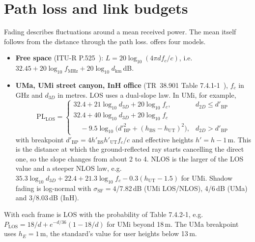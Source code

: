 \section{Path loss and link budgets}\label{sec:path-loss}
Fading describes fluctuations around a mean received power. The mean itself follows from the
distance through the path loss.  offers four models.
\begin{itemize}
  \item \textbf{Free space} (ITU-R P.525~\cite{p525}):
  $L=20\log_{10}(4\pi d f_c/c)$, i.e. $32.45+20\log_{10}f_{\mathrm{MHz}}+20\log_{10}d_{\mathrm{km}}$\,dB.
  \item \textbf{UMa, UMi street canyon, InH office} (TR~38.901 Table 7.4.1-1~\cite{tr38901}), $f_c$ in
  GHz and $d_{3D}$ in metres. LOS uses a dual-slope law. In UMi, for example,
  \begin{equation}
    \mathrm{PL}_{\mathrm{LOS}}=\begin{cases}32.4+21\log_{10}d_{3D}+20\log_{10}f_c, & d_{2D}\le d'_{\mathrm{BP}}\\
    32.4+40\log_{10}d_{3D}+20\log_{10}f_c\\
    \quad-9.5\log_{10}\big(d'^2_{\mathrm{BP}}+(h_{\mathrm{BS}}-h_{\mathrm{UT}})^2\big), & d_{2D}>d'_{\mathrm{BP}}\end{cases}
  \end{equation}
  with breakpoint $d'_{\mathrm{BP}}=4h'_{\mathrm{BS}}h'_{\mathrm{UT}}f_c/c$ and effective heights
  $h'=h-1$\,m. This is the distance at which the ground-reflected ray starts cancelling the direct
  one, so the slope changes from about 2 to 4. NLOS is the larger of the LOS value and a
  steeper NLOS law, e.g. $35.3\log_{10}d_{3D}+22.4+21.3\log_{10}f_c-0.3(h_{\mathrm{UT}}-1.5)$ for UMi.
  Shadow fading is log-normal with $\sigma_{\mathrm{SF}}=4$/7.82\,dB (UMi LOS/NLOS), 4/6\,dB (UMa)
  and 3/8.03\,dB (InH).
\end{itemize}
With  each frame is LOS with the probability of Table 7.4.2-1,
e.g. $P_{\mathrm{LOS}}=18/d+e^{-d/36}(1-18/d)$ for UMi beyond 18\,m. The UMa breakpoint uses
$h_E=1$\,m, the standard's value for user heights below 13\,m.

